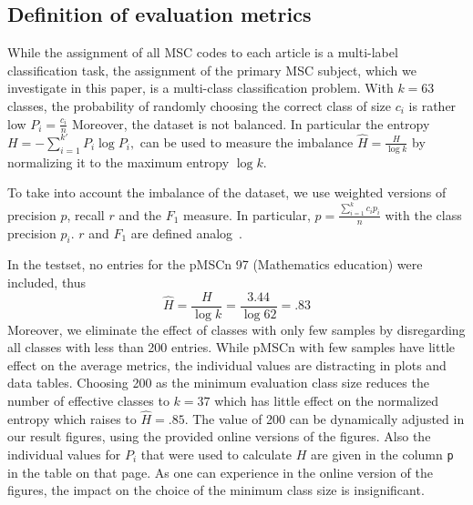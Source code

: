 \subsection{Definition of evaluation metrics}
While the assignment of all MSC codes to each article is a multi-label classification task, the assignment of the primary MSC subject, which we investigate in this paper, is a multi-class classification problem.
With $k=63$ classes, the probability of randomly choosing the correct class of size $c_i$ is rather low
\(
P_i=\frac{c_i}{n}
\)
Moreover, the dataset is not balanced. In particular the entropy \(
H=-\sum_{i=1}^{k'}P_i\log P_i,
\)
can be used to measure the imbalance \(
\hat{H}=\frac{H}{\log k}
\)
by normalizing it to the maximum entropy $\log k.$

To take into account the imbalance of the dataset, we use weighted versions of precision $p$, recall $r$ and the $F_1$ measure. In particular, \(
p=\frac{\sum_{i=1}^{k}c_ip_i}{n}
\) with the class precision $p_i$.
$r$ and $F_1$ are defined analog~\cite{SokolovaL09}.

In the testset, no entries for the pMSCn 97 (Mathematics education) were included, thus \[
\hat{H}=\frac{H}{\log k}=\frac{3.44}{\log 62}=.83
\]
Moreover, we eliminate the effect of classes with only few samples by disregarding all classes with less than 200 entries.
While pMSCn with few samples have little effect on the average metrics, the individual values are distracting in plots and data tables.
Choosing 200 as the minimum evaluation class size reduces the number of effective classes to $k=37$ which has little effect on the normalized entropy which raises to $\hat{H}=.85.$
The value of 200 can be dynamically adjusted in our result figures, using the provided online versions of the figures.
Also the individual values for $P_i$ that were used to calculate $H$ are given in the column \texttt{p} in the table on that page.
As one can experience in the online version of the figures, the impact on the choice of the minimum class size is insignificant.

